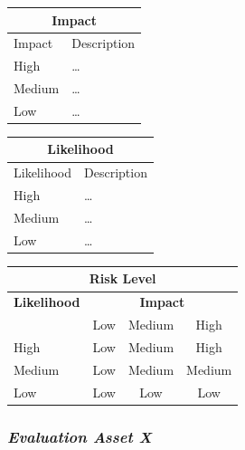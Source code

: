 \documentclass{article}
\begin{document}
\begin{center}
\begin{tabular}{|l|l|}
\hline
\multicolumn{2}{|c|}{\bf Impact} \\
\hline
Impact & Description \\
\hline
\hline
High   & \hspace*{20pt}\ldots \\
\hline
Medium & \hspace*{20pt}\ldots \\
\hline
Low   & \hspace*{20pt}\ldots \\
\hline
\end{tabular}
%
\vspace{5mm}
%
\noindent \hspace*{10pt}
\begin{tabular}{|l|l|}
\hline
\multicolumn{2}{|c|}{\bf Likelihood} \\
\hline
Likelihood & Description \\
\hline
\hline
High   & \hspace*{20pt}\ldots \\
\hline
Medium & \hspace*{20pt}\ldots \\
\hline
Low   & \hspace*{20pt}\ldots \\
\hline
\end{tabular}
\end{center}

\vspace{5mm}

\begin{center}
\begin{tabular}{|l|c|c|c|}
\hline
\multicolumn{4}{|c|}{{\bf Risk Level}} \\
\hline
{{\bf Likelihood}} & \multicolumn{3}{c|}{{\bf Impact}} \\ \cline{2-4}
     & Low & Medium & High \\  \hline
 High & Low & Medium & High  \\
\hline
 Medium & Low & Medium & Medium \\
\hline
 Low & Low & Low & Low \\
\hline
\end{tabular}
\end{center}

\subsubsection{{\it Evaluation Asset X}}
\end{document}
